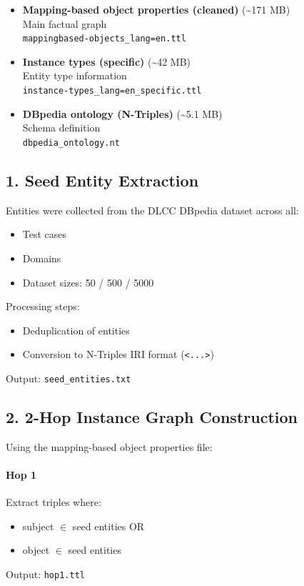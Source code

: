 \documentclass[a4paper,oneside,bibliography=totoc]{scrartcl}
\begin{document}
\begin{itemize}
    \item \textbf{Mapping-based object properties (cleaned)} (\textasciitilde171 MB) \\
    Main factual graph \\
    \texttt{mappingbased-objects\_lang=en.ttl}

    \item \textbf{Instance types (specific)} (\textasciitilde42 MB) \\
    Entity type information \\
    \texttt{instance-types\_lang=en\_specific.ttl}

    \item \textbf{DBpedia ontology (N-Triples)} (\textasciitilde5.1 MB) \\
    Schema definition \\
    \texttt{dbpedia\_ontology.nt}
\end{itemize}

\subsection{1. Seed Entity Extraction}

Entities were collected from the DLCC DBpedia dataset across all:
\begin{itemize}
    \item Test cases
    \item Domains
    \item Dataset sizes: 50 / 500 / 5000
\end{itemize}

Processing steps:
\begin{itemize}
    \item Deduplication of entities
    \item Conversion to N-Triples IRI format (\texttt{<...>})
\end{itemize}

\noindent Output: \texttt{seed\_entities.txt}

\subsection{2. 2-Hop Instance Graph Construction}

Using the mapping-based object properties file:

\paragraph{Hop 1}
Extract triples where:
\begin{itemize}
    \item subject $\in$ seed entities OR
    \item object $\in$ seed entities
\end{itemize}
Output: \texttt{hop1.ttl}
\end{document}
